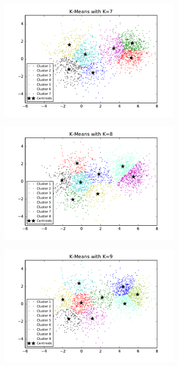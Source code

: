 \begin{description}
\begin{figure}[htb]
\begin{subfigure}[b]{0.475\textwidth}
            \includegraphics[width=\textwidth]{./figures/clustering_kMeans_7.pdf}
        \end{subfigure}
        \hfill
        \begin{subfigure}[b]{0.475\textwidth}  
            \centering 
            \includegraphics[width=\textwidth]{./figures/clustering_kMeans_8.pdf}
        \end{subfigure}
        \begin{subfigure}[b]{0.475\textwidth}   
            \centering 
            \includegraphics[width=\textwidth]{./figures/clustering_kMeans_9.pdf}

\end{subfigure}
\end{figure}
\end{description}
